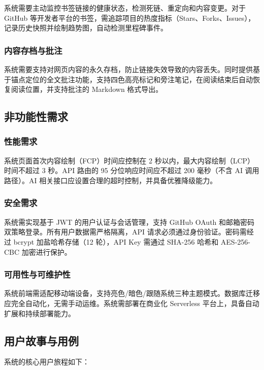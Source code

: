 \documentclass[12pt,a4paper]{ctexart}
\begin{document}
系统需要主动监控书签链接的健康状态，检测死链、重定向和内容变更。对于 GitHub 等开发者平台的书签，需追踪项目的热度指标（Stars、Forks、Issues），记录历史快照并绘制趋势图，自动检测里程碑事件。

\subsubsection{内容存档与批注}

系统需要支持对网页内容的永久存档，防止链接失效导致的内容丢失。同时提供基于锚点定位的全文批注功能，支持四色高亮标记和旁注笔记，在阅读结束后自动恢复阅读位置，并支持批注的 Markdown 格式导出。

\subsection{非功能性需求}

\subsubsection{性能需求}

系统页面首次内容绘制（FCP）时间应控制在 2 秒以内，最大内容绘制（LCP）时间不超过 3 秒。API 路由的 95 分位响应时间应不超过 200 毫秒（不含 AI 调用路径）。AI 相关接口应设置合理的超时控制，并具备优雅降级能力。

\subsubsection{安全需求}

系统需实现基于 JWT 的用户认证与会话管理，支持 GitHub OAuth 和邮箱密码双策略登录。所有用户数据需严格隔离，API 请求必须通过身份验证。密码需经过 bcrypt 加盐哈希存储（12 轮），API Key 需通过 SHA-256 哈希和 AES-256-CBC 加密进行保护。

\subsubsection{可用性与可维护性}

系统前端需适配移动端设备，支持亮色/暗色/跟随系统三种主题模式。数据库迁移应完全自动化，无需手动运维。系统需部署在商业化 Serverless 平台上，具备自动扩展和持续部署能力。

\subsection{用户故事与用例}

系统的核心用户旅程如下：
\end{document}
